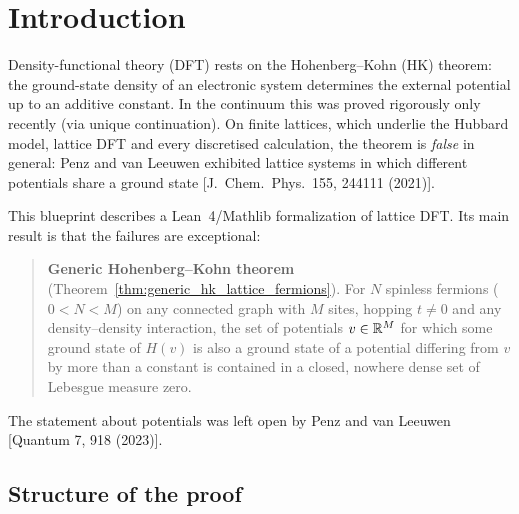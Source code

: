 \chapter{Introduction}

Density-functional theory (DFT) rests on the Hohenberg--Kohn (HK) theorem: the ground-state density of an
electronic system determines the external potential up to an additive constant. In the continuum this was
proved rigorously only recently (via unique continuation). On finite lattices, which underlie the Hubbard
model, lattice DFT and every discretised calculation, the theorem is \emph{false} in general: Penz and van
Leeuwen exhibited lattice systems in which different potentials share a ground state
[J.\ Chem.\ Phys.\ 155, 244111 (2021)].

This blueprint describes a Lean~4/Mathlib formalization of lattice DFT. Its main result is that the
failures are exceptional:

\begin{quote}
\textbf{Generic Hohenberg--Kohn theorem} (Theorem~\ref{thm:generic_hk_lattice_fermions}).
For $N$ spinless fermions ($0<N<M$) on any connected graph with $M$ sites, hopping $t\neq 0$ and any
density--density interaction, the set of potentials $v\in\mathbb{R}^M$ for which some ground state of $H(v)$ is also
a ground state of a potential differing from $v$ by more than a constant is contained in a closed, nowhere
dense set of Lebesgue measure zero.
\end{quote}

The statement about potentials was left open by Penz and van Leeuwen [Quantum 7, 918 (2023)].

\section*{Structure of the proof}

